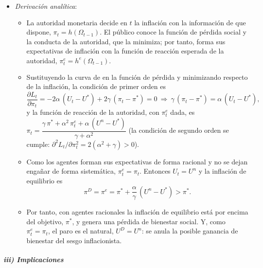 \documentclass[11pt]{article}
\begin{document}
\begin{itemize}
\item \emph{Derivación analítica}:
  \begin{itemize}
  \item La autoridad monetaria decide en $t$ la inflación con la información de que dispone, $\pi_t=h(\Omega_{t-1})$. El público conoce la función de pérdida social y la conducta de la autoridad, que la minimiza; por tanto, forma sus expectativas de inflación con la función de reacción esperada de la autoridad, $\pi^e_t=h^e(\Omega_{t-1})$.
  \item Sustituyendo la curva de  en la función de pérdida y minimizando respecto de la inflación, la condición de primer orden es
    \begin{equation*}
    \frac{\partial L_t}{\partial\pi_t}=-2\alpha\,(U_t-U^*)+2\gamma\,(\pi_t-\pi^*)=0\ \Longrightarrow\ \gamma\,(\pi_t-\pi^*)=\alpha\,(U_t-U^*),
    \end{equation*}
    y la función de reacción de la autoridad, con $\pi^e_t$ dada, es $\pi_t=\dfrac{\gamma\,\pi^*+\alpha^2\,\pi^e_t+\alpha\,(U^n-U^*)}{\gamma+\alpha^2}$ (la condición de segundo orden se cumple: $\partial^2L_t/\partial\pi_t^2=2(\alpha^2+\gamma)>0$).
  \item Como los agentes forman sus expectativas de forma racional y no se dejan engañar de forma sistemática, $\pi^e_t=\pi_t$. Entonces $U_t=U^n$ y la inflación de equilibrio es
    \begin{equation}\label{eq:sesgo}
    \pi^D=\pi^e=\pi^*+\frac{\alpha}{\gamma}\,(U^n-U^*)>\pi^* .
    \end{equation}
  \item Por tanto, con agentes racionales la inflación de equilibrio está por encima del objetivo, $\pi^*$, y genera una pérdida de bienestar social. Y, como $\pi^e_t=\pi_t$, el paro es el natural, $U^D=U^n$: se anula la posible ganancia de bienestar del sesgo inflacionista.
  \end{itemize}
\end{itemize}

\subparagraph{iii) Implicaciones}
\end{document}
